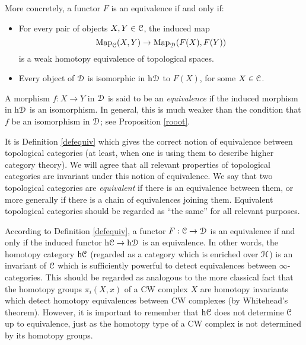 \begin{1.1.3 Equivalences of Top Cats}
More concretely, a functor $F$ is an equivalence if and only if:

\begin{itemize}
\item For every pair of objects $X,Y \in \operatorname{\mathcal{C}}$, the induced map
$$ \operatorname{{Map}}_{\operatorname{\mathcal{C}}}(X,Y) \rightarrow \operatorname{{Map}}_{\operatorname{\mathcal{D}}}(F(X),F(Y))$$ is a weak homotopy equivalence of topological spaces.

\item Every object of $\operatorname{\mathcal{D}}$ is isomorphic in $\rm{h} \it{ \operatorname{\mathcal{D}}}$ to $F(X)$, for some $X \in \operatorname{\mathcal{C}}$.
\end{itemize}

\begin{remark}
A morphism $f: X \rightarrow Y$ in $\operatorname{\mathcal{D}}$ is said to be an {\it equivalence} if the induced morphism in $\rm{h} \it{ \operatorname{\mathcal{D}}}$ is an isomorphism. In general, this is much weaker than the condition that $f$ be an isomorphism in $\operatorname{\mathcal{D}}$; see Proposition \ref{rooot}.
\end{remark}

It is Definition \ref{defequiv} which gives the correct notion of equivalence between topological categories (at least, when one is using them to describe higher category theory). We will agree that all relevant properties of topological categories are invariant under this notion of equivalence. We say that two topological categories are {\it equivalent} if there is an equivalence between them, or more generally if there is a chain of equivalences joining them. Equivalent topological categories should be regarded as ``the same'' for all relevant purposes.

\begin{remark}
According to Definition \ref{defequiv}, a functor $F: \operatorname{\mathcal{C}} \rightarrow \operatorname{\mathcal{D}}$ is an equivalence if and only if the induced functor $\rm{h} \it{\operatorname{\mathcal{C}}} \rightarrow \rm{h} \it{ \operatorname{\mathcal{D}}}$ is an equivalence. In other words, the homotopy category $\rm{h} \it{\operatorname{\mathcal{C}}}$ (regarded as a category which is enriched over $\operatorname{\mathcal{H}}$) is an invariant of $\operatorname{\mathcal{C}}$
which is sufficiently powerful to detect equivalences between $\infty$-categories.
This should be regarded as analogous to the more classical fact that the homotopy groups $\pi_i(X,x)$ of a CW complex $X$ are homotopy invariants which detect homotopy equivalences between CW complexes (by Whitehead's theorem). However, it is important to remember that $\rm{h} \it{ \operatorname{\mathcal{C}}}$ does not determine $\operatorname{\mathcal{C}}$ up to equivalence, just as the homotopy type of a CW complex is not determined by its homotopy groups.
\end{remark}
\end{1.1.3 Equivalences of Top Cats}

